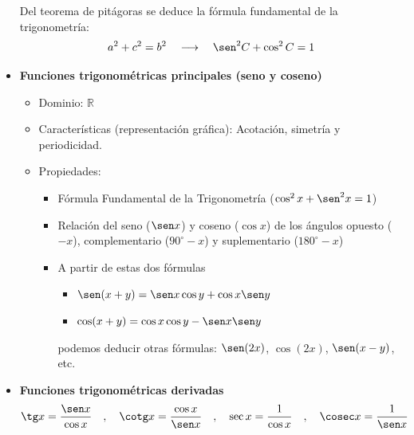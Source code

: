 \begin{itemize}
Del teorema de pitágoras se deduce la fórmula fundamental de la trigonometría:
$$a^2+c^2=b^2 \quad\longrightarrow\quad\displaystyle \sen^2 C + \cos^2 C = 1 $$    
\item
{\bf Funciones trigonométricas principales (seno y coseno)}
\begin{itemize}
\item 
Dominio: $\mathbb{R}$
\item 
Características (representación gráfica): Acotación, simetría y periodicidad.
\item 
Propiedades: 
\begin{itemize}
\item
Fórmula Fundamental de la Trigonometría ($\cos^2x+\sen^2x=1$)
\item
Relación del seno ($\sen x$) y coseno ($\cos x$) de los ángulos opuesto ($-x$), complementario ($90^\circ-x$) y suplementario ($180^\circ-x$)
\item
A partir de estas dos fórmulas
\begin{itemize}
\item 
$\sen(x+y)=\sen x\cos y+\cos x\sen y$
\item
$\cos(x+y)=\cos x\cos y-\sen x\sen y$
\end{itemize}
podemos deducir otras fórmulas: $\sen(2x)$, $\cos(2x)$, $\sen(x-y)$, etc.
\end{itemize}
\end{itemize}

\item
{\bf Funciones trigonométricas derivadas}
$$
\tg x=\dfrac{\sen x}{\cos x}
\quad,\quad
\cotg x=\dfrac{\cos x}{\sen x}
\quad,\quad
\sec x=\dfrac{1}{\cos x}
\quad,\quad
\cosec x=\dfrac{1}{\sen x}
$$


\end{itemize}

